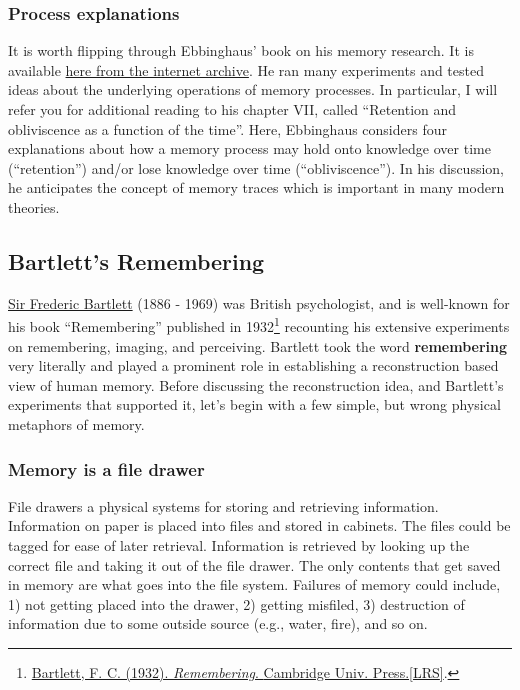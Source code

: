 \documentclass[
  oneside,
  12pt]{crumpbook}
\begin{document}
\hypertarget{process-explanations}{%
\subsubsection{Process explanations}\label{process-explanations}}

It is worth flipping through Ebbinghaus' book on his memory research. It is available \href{https://archive.org/details/memorycontributi00ebbiuoft}{here from the internet archive}. He ran many experiments and tested ideas about the underlying operations of memory processes. In particular, I will refer you for additional reading to his chapter VII, called ``Retention and obliviscence as a function of the time''. Here, Ebbinghaus considers four explanations about how a memory process may hold onto knowledge over time (``retention'') and/or lose knowledge over time (``obliviscence''). In his discussion, he anticipates the concept of memory traces which is important in many modern theories.

\hypertarget{bartletts-remembering}{%
\subsection{Bartlett's Remembering}\label{bartletts-remembering}}

\href{https://en.wikipedia.org/wiki/Frederic_Bartlett}{Sir Frederic Bartlett} (1886 - 1969) was British psychologist, and is well-known for his book ``Remembering'' published in 1932\footnote{\protect\hyperlink{ref-bartlettRemembering1932}{Bartlett, F. C. (1932). \emph{Remembering}. {Cambridge Univ. Press.{[}LRS{]}}}.} recounting his extensive experiments on remembering, imaging, and perceiving. Bartlett took the word \textbf{remembering} very literally and played a prominent role in establishing a reconstruction based view of human memory. Before discussing the reconstruction idea, and Bartlett's experiments that supported it, let's begin with a few simple, but wrong physical metaphors of memory.

\hypertarget{memory-is-a-file-drawer}{%
\subsubsection{Memory is a file drawer}\label{memory-is-a-file-drawer}}

File drawers a physical systems for storing and retrieving information. Information on paper is placed into files and stored in cabinets. The files could be tagged for ease of later retrieval. Information is retrieved by looking up the correct file and taking it out of the file drawer. The only contents that get saved in memory are what goes into the file system. Failures of memory could include, 1) not getting placed into the drawer, 2) getting misfiled, 3) destruction of information due to some outside source (e.g., water, fire), and so on.
\end{document}
